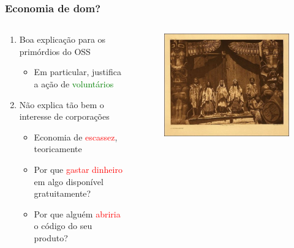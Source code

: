 \documentclass[xcolor=dvipsnames]{beamer}
\newcommand{\tred}[1]{\textcolor{red}{#1}}
\newcommand{\tgreen}[1]{\textcolor{green}{#1}}
\begin{document}
\begin{frame}
	\frametitle{Economia de dom?}
	\begin{columns}
	\begin{column}[c]{6cm} 
    \begin{enumerate}
      \item Boa explicação para os primórdios do OSS
        \begin{itemize}
        \item Em particular, justifica a ação de \tgreen{voluntários} \vspace{0.2cm}
        \end{itemize}\pause
      \item Não explica tão bem o interesse de corporações
        \begin{itemize}
        \item Economia de \tred{escassez}, teoricamente\vspace{0.2cm}
        \item Por que \tred{gastar dinheiro} em algo disponível gratuitamente?\vspace{0.2cm}
        \item Por que alguém \tred{abriria} o código do seu produto?
        \end{itemize}
    \end{enumerate}
    \end{column}
    \begin{column}[c]{5cm}
	\begin{figure}
	\begin{center}
 	\includegraphics[scale=0.3]{gift_economy.jpg}\\[0.1cm]

\end{center}
\end{figure}
\end{column}
\end{columns}
\end{frame}
\end{document}
